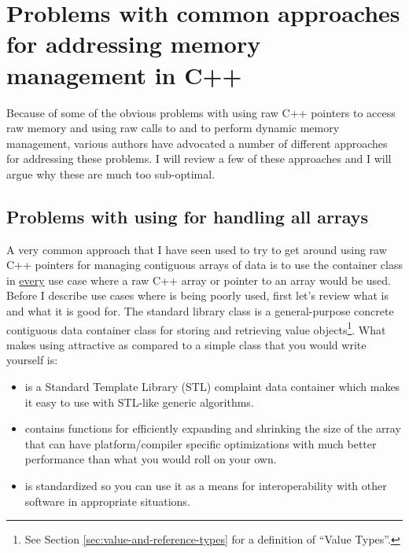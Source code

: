 \documentclass[pdf,ps2pdf,11pt]{SANDreport}
\begin{document}
%
{}\section{Problems with common approaches for addressing memory
management in C++}
\label{sec:current-appraoches-to-mem-mng}
%

Because of some of the obvious problems with using raw C++ pointers to
access raw memory and using raw calls to {} and
{} to perform dynamic memory management, various authors
have advocated a number of different approaches for addressing these
problems.  I will review a few of these approaches and I will argue
why these are much too sub-optimal.


%
{}\subsection{Problems with using {} for handling
all arrays}
%

A very common approach that I have seen used to try to get around
using raw C++ pointers for managing contiguous arrays of data is to
use the container class {} in {}\underline{every} use
case where a raw C++ array or pointer to an array would be used.
Before I describe use cases where {} is being poorly
used, first let's review what {} is and what it is
good for.  The standard library class {} is a
general-purpose concrete contiguous data container class for storing
and retrieving value objects\footnote{See Section
{}\ref{sec:value-and-reference-types} for a definition of ``Value
Types''.}.  What makes using {} attractive as
compared to a simple class that you would write yourself is:

\begin{itemize}

{}\item{} is a Standard Template Library (STL)
complaint data container which makes it easy to use with STL-like
generic algorithms.

{}\item{} contains functions for efficiently
expanding and shrinking the size of the array that can have
platform/compiler specific optimizations with much better performance
than what you would roll on your own.

{}\item{} is standardized so you can use it as a
means for interoperability with other software in appropriate
situations.

\end{itemize}
\end{document}
